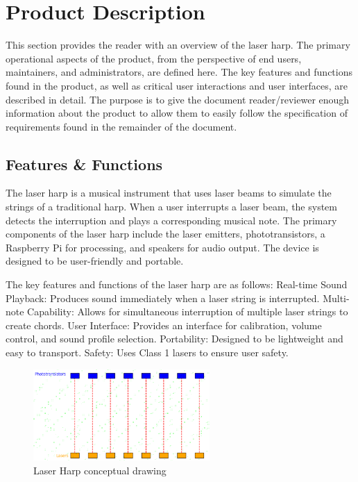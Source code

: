 \section{Product Description}

This section provides the reader with an overview of the laser harp. The primary operational aspects of the product, from the perspective of end users, maintainers, and administrators, are defined here. The key features and functions found in the product, as well as critical user interactions and user interfaces, are described in detail. The purpose is to give the document reader/reviewer enough information about the product to allow them to easily follow the specification of requirements found in the remainder of the document.

\subsection{Features \& Functions}
The laser harp is a musical instrument that uses laser beams to simulate the strings of a traditional harp. When a user interrupts a laser beam, the system detects the interruption and plays a corresponding musical note. The primary components of the laser harp include the laser emitters, phototransistors, a Raspberry Pi for processing, and speakers for audio output. The device is designed to be user-friendly and portable.

The key features and functions of the laser harp are as follows:
Real-time Sound Playback: Produces sound immediately when a laser string is interrupted.
Multi-note Capability: Allows for simultaneous interruption of multiple laser strings to create chords.
User Interface: Provides an interface for calibration, volume control, and sound profile selection.
Portability: Designed to be lightweight and easy to transport.
Safety: Uses Class 1 lasers to ensure user safety.

\begin{figure}[h!]
	\centering
   	\includegraphics[width=0.60\textwidth]{images/Design}
    \caption{Laser Harp conceptual drawing}
\end{figure}

